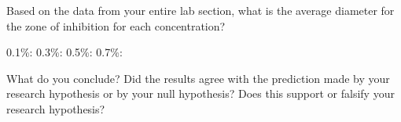\documentclass[12pt]{exam}
\begin{document}
\begin{questions}

\question \label{ques:zoi}
Based on the data from your entire lab section, what is the average diameter for the zone of inhibition for each concentration?

\vspace*{0.5\baselineskip}

0.1\%: \hfill 0.3\%: \hfill 0.5\%: \hfill 0.7\%: \hfill \phantom{|}

\vspace*{0.5\baselineskip}

%
%
%

\question
What do you conclude?  Did the results agree with the prediction made by your research hypothesis or by your null hypothesis? Does this support or falsify your research hypothesis?

\vspace*{3\baselineskip}


%
%
%
%	
%		
%
%
%
\end{questions}
\end{document}
